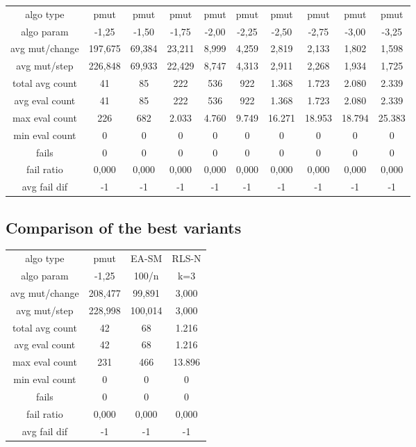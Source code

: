 \begin{tabular}[h]{cccccccccc}
algo type&           pmut&    pmut&    pmut&    pmut&    pmut&    pmut&    pmut&    pmut&    pmut\\
algo param&         -1,25&   -1,50&   -1,75&   -2,00&   -2,25&   -2,50&   -2,75&   -3,00&   -3,25\\
avg mut/change&   197,675&  69,384&  23,211&   8,999&   4,259&   2,819&   2,133&   1,802&   1,598\\
avg mut/step&     226,848&  69,933&  22,429&   8,747&   4,313&   2,911&   2,268&   1,934&   1,725\\
\hline
total avg count&       41&      85&     222&     536&     922&   1.368&   1.723&   2.080&   2.339\\
avg eval count&        41&      85&     222&     536&     922&   1.368&   1.723&   2.080&   2.339\\
max eval count&       226&     682&   2.033&   4.760&   9.749&  16.271&  18.953&  18.794&  25.383\\
min eval count&         0&       0&       0&       0&       0&       0&       0&       0&       0\\
\hline
fails&                  0&       0&       0&       0&       0&       0&       0&       0&       0\\
fail ratio&         0,000&   0,000&   0,000&   0,000&   0,000&   0,000&   0,000&   0,000&   0,000\\
avg fail dif&          -1&      -1&      -1&      -1&      -1&      -1&      -1&      -1&      -1\\
\end{tabular}


\subsection{Comparison of the best variants}


\begin{tabular}[h]{cccc}
algo type&           pmut&   EA-SM&   RLS-N\\
algo param&         -1,25&   100/n&     k=3\\
avg mut/change&   208,477&  99,891&   3,000\\
avg mut/step&     228,998& 100,014&   3,000\\
\hline
total avg count&       42&      68&   1.216\\
avg eval count&        42&      68&   1.216\\
max eval count&       231&     466&  13.896\\
min eval count&         0&       0&       0\\
\hline
fails&                  0&       0&       0\\
fail ratio&         0,000&   0,000&   0,000\\
avg fail dif&          -1&      -1&      -1\\
\end{tabular}


